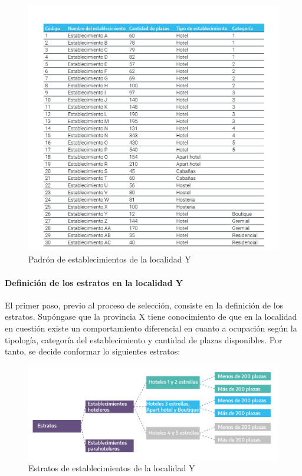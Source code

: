 \documentclass[
]{book}
\begin{document}
\begin{figure}

{\centering \includegraphics[width=1\linewidth]{imagenes/tabla_1} 

}

\caption{ Padrón de establecimientos de la localidad Y}\label{fig:padronY}
\end{figure}

\hypertarget{definiciuxf3n-de-los-estratos-en-la-localidad-y}{%
\paragraph{Definición de los estratos en la localidad Y}\label{definiciuxf3n-de-los-estratos-en-la-localidad-y}}

El primer paso, previo al proceso de selección, consiste en la definición de los estratos. Supóngase que la provincia X tiene conocimiento de que en la localidad en cuestión existe un comportamiento diferencial en cuanto a ocupación según la tipología, categoría del establecimiento y cantidad de plazas disponibles. Por tanto, se decide conformar lo siguientes estratos:

\begin{figure}

{\centering \includegraphics[width=1\linewidth]{imagenes/figura_1} 

}

\caption{ Estratos de establecimientos de la localidad Y}\label{fig:localidadY}
\end{figure}
\end{document}
